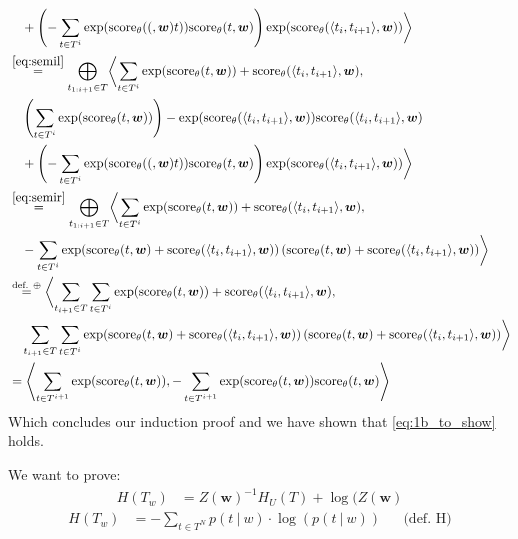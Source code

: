 \documentclass[a4paper,12pt]{ETHexercise}
\begin{document}
\begin{question}
\begin{subquestion}
\begin{align}
			 & \quad + \left( -\sum_{t \in T^{i}} \exp(\sscore(t)) \sscore{t} \right) \exp(\score{t_i}{t_{i+1}}) \biggr\rangle                                                     \\
			 & \overset{\cref{eq:semil}}{=} \bigoplus_{t_{1:i+1} \in T} \biggl\langle \sum_{t \in T^{i}} \exp(\sscore{t}) + \score{t_i}{t_{i+1}}, \nonumber                        \\
			 & \quad \left( \sum_{t \in T^{i}} \exp(\sscore{t}) \right) -\exp(\score{t_i}{t_{i+1}}) \score{t_i}{t_{i+1}} \nonumber                                                 \\
			 & \quad + \left( -\sum_{t \in T^{i}} \exp(\sscore(t)) \sscore{t} \right) \exp(\score{t_i}{t_{i+1}}) \biggr\rangle                                                     \\
			 & \overset{\cref{eq:semir}}{=} \bigoplus_{t_{1:i+1} \in T} \biggl\langle \sum_{t \in T^{i}} \exp(\sscore{t}) + \score{t_i}{t_{i+1}}, \nonumber                        \\
			 & \quad -\sum_{t \in T^{i}} \exp(\sscore{t} + \score{t_i}{t_{i+1}}) \left( \sscore{t} + \score{t_i}{t_{i+1}} \right) \biggr\rangle                                    \\
			 & \overset{\text{def. } \oplus}{=} \biggl\langle \sum_{t_{i+1} \in T} \sum_{t \in T^{i}} \exp(\sscore{t}) + \score{t_i}{t_{i+1}}, \nonumber                           \\
			 & \quad \sum_{t_{i+1} \in T} \sum_{t \in T^{i}} \exp(\sscore{t} + \score{t_i}{t_{i+1}}) \left( \sscore{t} + \score{t_i}{t_{i+1}} \right) \biggr\rangle                \\
			 & = \left\langle \sum_{t \in T^{i+1}} \exp(\sscore{t}), -\sum_{t \in T^{i+1}} \exp(\sscore{t}) \sscore{t} \right\rangle
		\end{align}
		Which concludes our induction proof and we have shown that \cref*{eq:1b_to_show} holds.
	\end{subquestion}
	\begin{subquestion}
		We want to prove:\\
		\begin{align}
			H(T_w) & = Z(\boldsymbol{w})^{-1} H_U(T) + \log(Z(\boldsymbol{w})
		\end{align}
		\begin{align}
			H(T_w) & = -\sum_{t \in T^{N}} p(t \:|\: w) \cdot \log(p(t \:|\: w))                                                                                                         &  & \text{(def. H)} \\

\end{align}
\end{subquestion}
\end{question}
\end{document}
